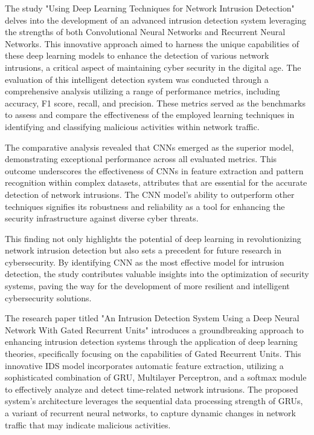 The study "Using Deep Learning Techniques for Network Intrusion Detection" delves into the development of an advanced intrusion detection system leveraging the strengths of both Convolutional Neural Networks and Recurrent Neural Networks. This innovative approach aimed to harness the unique capabilities of these deep learning models to enhance the detection of various network intrusions, a critical aspect of maintaining cyber security in the digital age. The evaluation of this intelligent detection system was conducted through a comprehensive analysis utilizing a range of performance metrics, including accuracy, F1 score, recall, and precision. These metrics served as the benchmarks to assess and compare the effectiveness of the employed learning techniques in identifying and classifying malicious activities within network traffic.\par
The comparative analysis revealed that CNNs emerged as the superior model, demonstrating exceptional performance across all evaluated metrics. This outcome underscores the effectiveness of CNNs in feature extraction and pattern recognition within complex datasets, attributes that are essential for the accurate detection of network intrusions. The CNN model's ability to outperform other techniques signifies its robustness and reliability as a tool for enhancing the security infrastructure against diverse cyber threats.\par 
This finding not only highlights the potential of deep learning in revolutionizing network intrusion detection but also sets a precedent for future research in cybersecurity. By identifying CNN as the most effective model for intrusion detection, the study contributes valuable insights into the optimization of security systems, paving the way for the development of more resilient and intelligent cybersecurity solutions\cite{al2020using}.
\par 
The research paper titled "An Intrusion Detection System Using a Deep Neural Network With Gated Recurrent Units" introduces a groundbreaking approach to enhancing intrusion detection systems through the application of deep learning theories, specifically focusing on the capabilities of Gated Recurrent Units. This innovative IDS model incorporates automatic feature extraction, utilizing a sophisticated combination of GRU, Multilayer Perceptron, and a softmax module to effectively analyze and detect time-related network intrusions. The proposed system's architecture leverages the sequential data processing strength of GRUs, a variant of recurrent neural networks, to capture dynamic changes in network traffic that may indicate malicious activities.\par 
